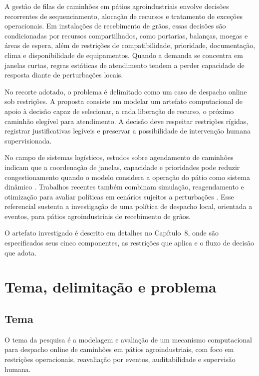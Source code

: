 \documentclass[
  12pt,
  oneside,
  a4paper,
  sumario=tradicional,
  brazil
]{abntex2}
\begin{document}
A gest\~ao de filas de caminh\~oes em p\'atios agroindustriais envolve decis\~oes recorrentes de sequenciamento, aloca\c{c}\~ao de recursos e tratamento de exce\c{c}\~oes operacionais. Em instala\c{c}\~oes de recebimento de gr\~aos, essas decis\~oes s\~ao condicionadas por recursos compartilhados, como portarias, balan\c{c}as, moegas e \'areas de espera, al\'em de restri\c{c}\~oes de compatibilidade, prioridade, documenta\c{c}\~ao, clima e disponibilidade de equipamentos. Quando a demanda se concentra em janelas curtas, regras est\'aticas de atendimento tendem a perder capacidade de resposta diante de perturba\c{c}\~oes locais.

No recorte adotado, o problema \'e delimitado como um caso de despacho online sob restri\c{c}\~oes. A proposta consiste em modelar um artefato computacional de apoio \`a decis\~ao capaz de selecionar, a cada libera\c{c}\~ao de recurso, o pr\'oximo caminh\~ao eleg\'ivel para atendimento. A decis\~ao deve respeitar restri\c{c}\~oes r\'igidas, registrar justificativas leg\'iveis e preservar a possibilidade de interven\c{c}\~ao humana supervisionada.

No campo de sistemas log\'isticos, estudos sobre agendamento de caminh\~oes indicam que a coordena\c{c}\~ao de janelas, capacidade e prioridades pode reduzir congestionamento quando o modelo considera a opera\c{c}\~ao do p\'atio como sistema din\^amico \cite{Phan2016,Azab2017,Zhang2019}. Trabalhos recentes tamb\'em combinam simula\c{c}\~ao, reagendamento e otimiza\c{c}\~ao para avaliar pol\'iticas em cen\'arios sujeitos a perturba\c{c}\~oes \cite{DaSilva2023,Bett2024,Bouyahia2025}. Esse referencial sustenta a investiga\c{c}\~ao de uma pol\'itica de despacho local, orientada a eventos, para p\'atios agroindustriais de recebimento de gr\~aos.

O artefato investigado \'e descrito em detalhes no Cap\'itulo~8, onde s\~ao especificados seus cinco componentes, as restri\c{c}\~oes que aplica e o fluxo de decis\~ao que adota.

\chapter{Tema, delimita\c{c}\~ao e problema}

\section{Tema}
O tema da pesquisa \'e a modelagem e avalia\c{c}\~ao de um mecanismo computacional para despacho online de caminh\~oes em p\'atios agroindustriais, com foco em restri\c{c}\~oes operacionais, reavalia\c{c}\~ao por eventos, auditabilidade e supervis\~ao humana.
\end{document}
